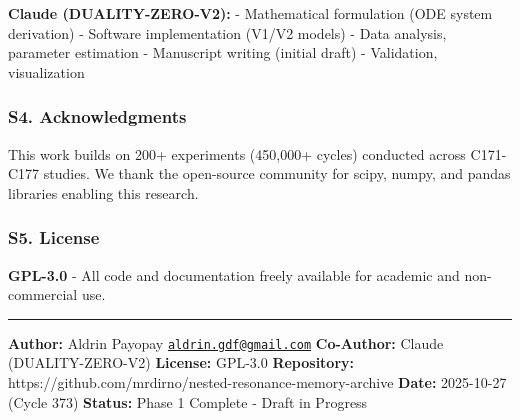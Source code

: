 \documentclass[
]{article}
\begin{document}
\textbf{Claude (DUALITY-ZERO-V2):} - Mathematical formulation (ODE
system derivation) - Software implementation (V1/V2 models) - Data
analysis, parameter estimation - Manuscript writing (initial draft) -
Validation, visualization

\subsubsection{S4. Acknowledgments}\label{s4.-acknowledgments}

This work builds on 200+ experiments (450,000+ cycles) conducted across
C171-C177 studies. We thank the open-source community for scipy, numpy,
and pandas libraries enabling this research.

\subsubsection{S5. License}\label{s5.-license}

\textbf{GPL-3.0} - All code and documentation freely available for
academic and non-commercial use.

\begin{center}\rule{0.5\linewidth}{0.5pt}\end{center}

\textbf{Author:} Aldrin Payopay
\href{mailto:aldrin.gdf@gmail.com}{\nolinkurl{aldrin.gdf@gmail.com}}
\textbf{Co-Author:} Claude (DUALITY-ZERO-V2) \textbf{License:} GPL-3.0
\textbf{Repository:}
https://github.com/mrdirno/nested-resonance-memory-archive
\textbf{Date:} 2025-10-27 (Cycle 373) \textbf{Status:} Phase 1 Complete
- Draft in Progress
\end{document}
